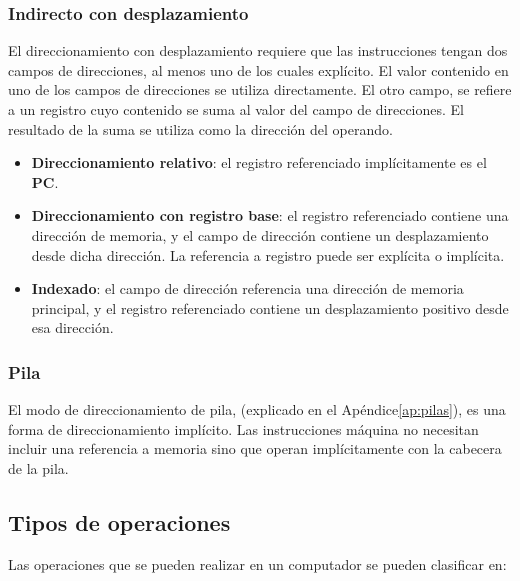 \begin{subs}
  \subsubsection{Indirecto con desplazamiento}

  El direccionamiento con desplazamiento requiere que las instrucciones tengan dos campos de direcciones, al menos uno de los cuales explícito. El valor contenido en uno de los campos de direcciones se utiliza directamente. El otro campo, se refiere a un registro cuyo contenido se suma al valor del campo de direcciones. El resultado de la suma se utiliza como la dirección del operando.

  \begin{itemize}
    \item \textbf{Direccionamiento relativo}: el registro referenciado implícitamente es el \textbf{PC}. 
    \item \textbf{Direccionamiento con registro base}: el registro referenciado contiene una dirección de memoria, y el campo de dirección contiene un desplazamiento desde dicha dirección. La referencia a registro puede ser explícita o implícita.
    \item \textbf{Indexado}: el campo de dirección referencia una dirección de memoria principal, y el registro referenciado contiene un desplazamiento positivo desde esa dirección.
  \end{itemize}

  \subsubsection{Pila}

  El modo de direccionamiento de pila, (explicado en el Apéndice\ref{ap:pilas}), es una forma de direccionamiento implícito. Las instrucciones máquina no necesitan incluir una referencia a memoria sino que operan implícitamente con la cabecera de la pila.
\end{subs}

\subsection{Tipos de operaciones}

Las operaciones que se pueden realizar en un computador se pueden clasificar en:


